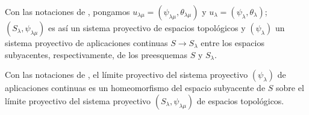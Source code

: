 \begin{env}[8.2.8]
\label{IV.8.2.8-fr}
Con las notaciones de , pongamos $u_{\lambda\mu}=(\psi_{\lambda\mu},\theta_{\lambda\mu})$ y $u_\lambda=(\psi_\lambda,\theta_\lambda)$; $(S_\lambda,\psi_{\lambda\mu})$ es así un sistema proyectivo de espacios topológicos y $(\psi_\lambda)$ un sistema proyectivo de aplicaciones continuas $S\to S_\lambda$ entre los espacios subyacentes, respectivamente, de los preesquemas $S$ y $S_\lambda$.
\end{env}

\begin{proposition}[8.2.9]
\label{IV.8.2.9-fr}
Con las notaciones de , el límite proyectivo del sistema proyectivo $(\psi_\lambda)$ de aplicaciones continuas es un homeomorfismo del espacio subyacente de $S$ sobre el límite proyectivo del sistema proyectivo $(S_\lambda,\psi_{\lambda\mu})$ de espacios topológicos.
\end{proposition}

